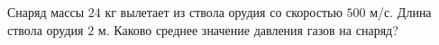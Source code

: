Снаряд массы $24$ кг вылетает из ствола орудия со скоростью $500$ м/с.
Длина ствола орудия $2$ м. Каково среднее значение давления газов на
снаряд?
